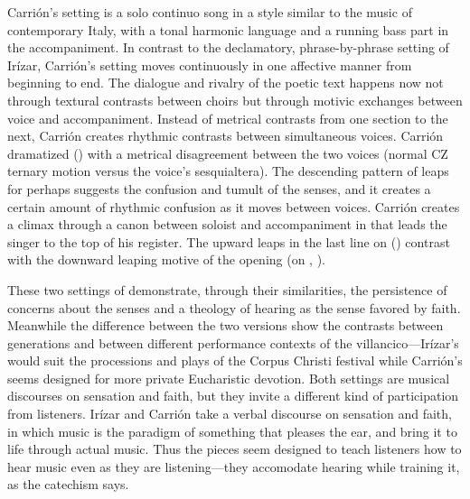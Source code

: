 
Carrión's setting is a solo continuo song in a style similar to the  music of contemporary Italy, with a tonal harmonic language and a running bass part in the accompaniment.
In contrast to the declamatory, phrase-by-phrase setting of Irízar, Carrión's setting moves continuously in one affective manner from beginning to end.
The dialogue and rivalry of the poetic text happens now not through textural contrasts between choirs but through motivic exchanges between voice and accompaniment.
Instead of metrical contrasts from one section to the next, Carrión creates rhythmic contrasts between simultaneous voices.
Carrión dramatized  () with a metrical disagreement between the two voices (normal CZ ternary motion versus the voice's sesquialtera).
The descending pattern of leaps for  perhaps suggests the confusion and tumult of the senses, and it creates a certain amount of rhythmic confusion as it moves between voices.
Carrión creates a climax through a canon between soloist and accompaniment in  that leads the singer to the top of his register.
The upward leaps in the last line on  () contrast with the downward leaping motive of the opening (on , ).

These two settings of  demonstrate, through their similarities, the persistence of concerns about the senses and a theology of hearing as the sense favored by faith.
Meanwhile the difference between the two versions show the contrasts between generations and between different performance contexts of the villancico---Irízar's would suit the processions and plays of the Corpus Christi festival while Carrión's seems designed for more private Eucharistic devotion.
Both settings are musical discourses on sensation and faith, but they invite a different kind of participation from listeners.
Irízar and Carrión take a verbal discourse on sensation and faith, in which music is the paradigm of something that pleases the ear, and bring it to life through actual music.
Thus the pieces seem designed to teach listeners how to hear music even as they are listening---they accomodate hearing while training it, as the catechism says.

